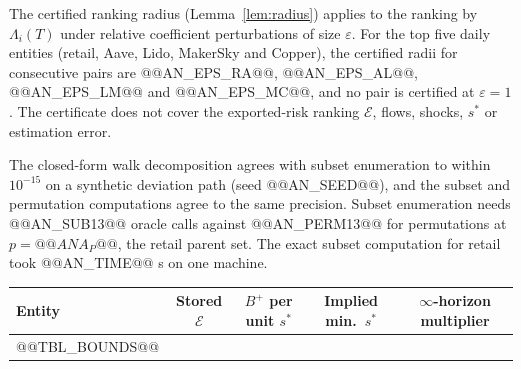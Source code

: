 \documentclass[referee,pdflatex,sn-mathphys-ay]{sn-jnl}
\newcommand{\fitbox}{\ifdim\wd\tabbox>\linewidth\resizebox{\linewidth}{!}{\usebox{\tabbox}}\else\usebox{\tabbox}\fi}%
\theoremstyle{thmstyleone}%
\theoremstyle{thmstyletwo}%
\theoremstyle{thmstylethree}%
\begin{document}
\begin{appendices}
The certified ranking radius (Lemma~\ref{lem:radius}) applies to the ranking by $\Lambda_i(T)$ under relative coefficient
perturbations of size $\varepsilon$. For the top five daily entities (retail, Aave, Lido, MakerSky and Copper), the certified radii
for consecutive pairs are @@AN_EPS_RA@@, @@AN_EPS_AL@@, @@AN_EPS_LM@@ and @@AN_EPS_MC@@, and no pair is certified at $\varepsilon=1$.
The certificate does not cover the exported-risk ranking $\mathcal{E}$, flows, shocks, $s^\ast$ or estimation error.

The closed-form walk decomposition agrees with subset enumeration to within $10^{-15}$ on a synthetic deviation path (seed
@@AN_SEED@@), and the subset and permutation computations agree to the same precision. Subset enumeration needs @@AN_SUB13@@ oracle calls
against @@AN_PERM13@@ for permutations at $p=@@ANA_P@@$, the retail parent set. The exact subset computation for retail took @@AN_TIME@@ s on one machine.

\begin{lrbox}{\tabbox}\footnotesize\setlength{\tabcolsep}{3pt}%
\begin{tabular}{@{}lcccc@{}}
\toprule
\textbf{Entity} & \textbf{Stored $\mathcal{E}$} & \textbf{$B^+$ per unit $s^\ast$} & \textbf{Implied min.\ $s^\ast$} & \textbf{$\infty$-horizon multiplier}\\
\midrule
@@TBL_BOUNDS@@
\bottomrule
\end{tabular}
\end{lrbox}
\begin{tableorg}[tbp]
\centering
\caption{Flow-free bounds on exported risk, daily specification ($T=@@AN_T@@$), bounded entities only.}
\label{tab:bounds}
\fitbox
\end{tableorg}

\end{appendices}

{\footnotesize\linespread{1.05}\selectfont
}
\end{document}
